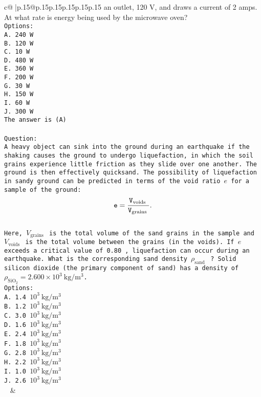 \documentclass{article}
\begin{document}
{\begin{supertabular}{c@{$\;$}|p{.15\linewidth}@{}p{.15\linewidth}p{.15\linewidth}p{.15\linewidth}p{.15\linewidth}p{.15\linewidth}}
{{{an outlet, 120 V, and draws a current of 2 amps. At what rate is energy being used by the microwave oven?\\ \tt Options:\\ \tt A. 240 W\\ \tt B. 120 W\\ \tt C. 10 W\\ \tt D. 480 W\\ \tt E. 360 W\\ \tt F. 200 W\\ \tt G. 30 W\\ \tt H. 150 W\\ \tt I. 60 W\\ \tt J. 300 W\\ \tt The answer is (A)\\ \tt \\ \tt Question:\\ \tt A heavy object can sink into the ground during an earthquake if the shaking causes the ground to undergo liquefaction, in which the soil grains experience little friction as they slide over one another. The ground is then effectively quicksand. The possibility of liquefaction in sandy ground can be predicted in terms of the void ratio $e$ for a sample of the ground:\\ \tt $$\\ \tt e=\frac{V_{\text {voids }}}{V_{\text {grains }}} .\\ \tt $$\\ \tt Here, $V_{\text {grains }}$ is the total volume of the sand grains in the sample and $V_{\text {voids }}$ is the total volume between the grains (in the voids). If $e$ exceeds a critical value of 0.80 , liquefaction can occur during an earthquake. What is the corresponding sand density $\rho_{\text {sand }}$ ? Solid silicon dioxide (the primary component of sand) has a density of $\rho_{\mathrm{SiO}_2}=2.600 \times 10^3 \mathrm{~kg} / \mathrm{m}^3$.\\ \tt Options:\\ \tt A. 1.4 $10^3 \mathrm{~kg} / \mathrm{m}^3$\\ \tt B. 1.2 $10^3 \mathrm{~kg} / \mathrm{m}^3$\\ \tt C. 3.0 $10^3 \mathrm{~kg} / \mathrm{m}^3$\\ \tt D. 1.6 $10^3 \mathrm{~kg} / \mathrm{m}^3$\\ \tt E. 2.4 $10^3 \mathrm{~kg} / \mathrm{m}^3$\\ \tt F. 1.8 $10^3 \mathrm{~kg} / \mathrm{m}^3$\\ \tt G. 2.8 $10^3 \mathrm{~kg} / \mathrm{m}^3$\\ \tt H. 2.2 $10^3 \mathrm{~kg} / \mathrm{m}^3$\\ \tt I. 1.0 $10^3 \mathrm{~kg} / \mathrm{m}^3$\\ \tt J. 2.6 $10^3 \mathrm{~kg} / \mathrm{m}^3$\\ \tt  
	  } 
	   } 
	   } 
	 & \\ 
 


\end{supertabular}}
\end{document}
